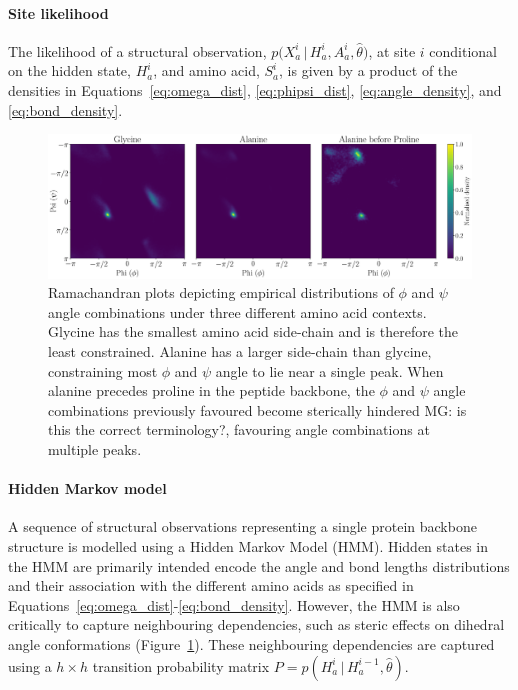 \documentclass[nogrid]{MBE}%
\newcommand{\revcom}[1]{{\color{orange} #1}}
\begin{document}
\paragraph{Site likelihood}
The likelihood of a structural observation, $p\big(X_{a}^{i}\,|\,H_{a}^{i},A_{a}^{i},\hat{\theta}\big)$, at site $i$ conditional on the hidden state, $H^{i}_a$, and amino acid, $S^{i}_a$, is given by a product of the densities in Equations~\ref{eq:omega_dist}, \ref{eq:phipsi_dist}, \ref{eq:angle_density}, and \ref{eq:bond_density}.

\begin{figure}
	\centering
	\includegraphics[width=2.0\columnwidth]{figures/ramachandran_empirical.pdf}
	\caption{Ramachandran plots depicting empirical distributions of $\phi$ and $\psi$ angle combinations under three different amino acid contexts. Glycine has the smallest amino acid side-chain and is therefore the least constrained. Alanine has a larger side-chain than glycine, constraining most $\phi$ and $\psi$ angle to lie near a single peak. When alanine precedes proline in the peptide backbone, the $\phi$ and $\psi$ angle combinations previously favoured become sterically hindered \revcom{MG: is this the correct terminology?}, favouring angle combinations at multiple peaks.}%
	\label{fig:ramachandranempirical}%
\end{figure}

\paragraph{Hidden Markov model}
A sequence of structural observations representing a single protein backbone structure is modelled using a Hidden Markov Model (HMM). Hidden states in the HMM are primarily intended encode the angle and bond lengths distributions and their association with the different amino acids as specified in Equations~\ref{eq:omega_dist}-\ref{eq:bond_density}. However, the HMM is also critically to capture neighbouring dependencies, such as steric effects on dihedral angle conformations (Figure~\ref{fig:ramachandranempirical}). These neighbouring dependencies are captured using a $h\times{h}$ transition probability matrix  $P=p(H_{a}^{i}\,|\,H_{a}^{i-1},\hat{\theta})$.
\end{document}
